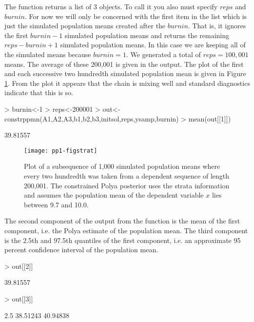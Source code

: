 \documentclass{article}
\begin{document}
The function \verb@constrppmn@ returns a
 list of 3 objects. To call it  you also must 
specify $reps$ and $burnin$. For now we will only be concerned 
with  the first item in the list which is just the simulated population
means created after the $burnin$. That is, it ignores the first
$burnin -1$ simulated population means and returns the 
remaining $reps-burnin +1$
simulated population means. In this case we are keeping all of the 
simulated means because $burnin =1$. 
We generated a total of  $reps=100,001$ means. The average of these 200,001
is given in the output.
The plot of the first and each successive two hundredth simulated 
population mean is given 
in Figure \ref{fig:strat}. From the plot it appears that the chain is 
mixing well and standard diagnostics indicate that this is so.


\begin{Schunk}
\begin{Sinput}
> burnin<-1
> reps<-200001
> out<-constrppmn(A1,A2,A3,b1,b2,b3,initsol,reps,ysamp,burnin)
> mean(out[[1]])
\end{Sinput}
\begin{Soutput}
[1] 39.81557
\end{Soutput}
\end{Schunk}



\begin{figure}
\begin{center}
\texttt{[image: pp1-figstrat]}
\end{center}
\caption{Plot of a subsequence of 1,000 simulated  population 
means where every two hundredth was taken from a dependent sequence 
of length 200,001.  The constrained Polya posterior uses 
the strata information and assumes the population mean of the 
dependent variable $x$ lies between 9.7 and 10.0.}
\label{fig:strat}
\end{figure}

The second component of the output from the function \verb@constrppmn@ 
  is the mean  of the first component, i.e. the Polya estimate of the
  population mean. The third component is the 2.5th and 97.5th
  quantiles of the first component, i.e. an approximate 95 percent
  confidence interval of the population mean.

\begin{Schunk}
\begin{Sinput}
> out[[2]] 
\end{Sinput}
\begin{Soutput}
[1] 39.81557
\end{Soutput}
\begin{Sinput}
> out[[3]] 
\end{Sinput}
\begin{Soutput}
    2.5%    97.5% 
38.51243 40.94838 
\end{Soutput}
\end{Schunk}
\end{document}
